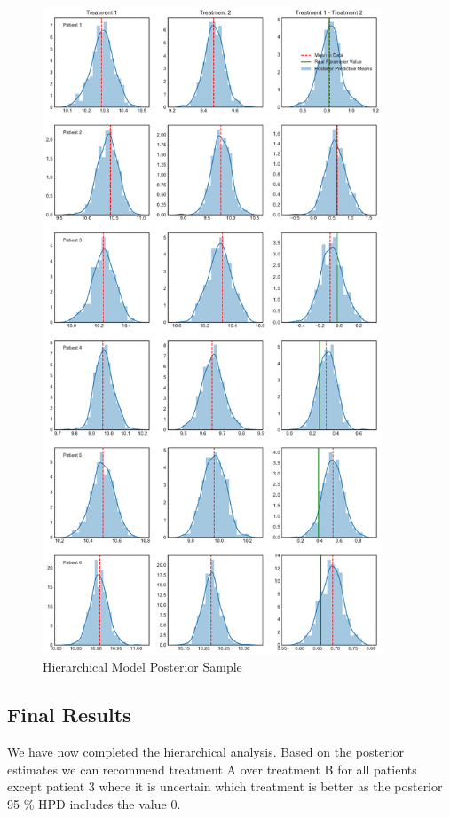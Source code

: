 \documentclass[12pt,a4paper,leqno]{report}
\theoremstyle{plain}
\theoremstyle{definition}
\theoremstyle{remark}
\begin{document}
\begin{figure}[H]
    \caption{Hierarchical Model Posterior Sample}\label{hierarchicalmodelposteriorsampling}
    \bigskip
    \centering
    \includegraphics[width=\textwidth,height=7.6in,keepaspectratio]{hierarchical_model_posterior_sampling.pdf}
\end{figure}

\subsection{Final Results}

We have now completed the hierarchical analysis. Based on the posterior estimates we can
recommend treatment A over treatment B for all patients except patient 3 where it is
uncertain which treatment is better as the posterior 95 \% HPD includes the value 0.
\end{document}
